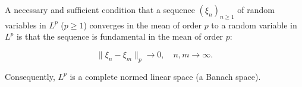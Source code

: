 A necessary and sufficient condition that a sequence $(\xi_n)_{n \geq 1}$ of random variables in $L^p$ ($p \geq 1$) converges in the mean of order $p$ to a random variable in $L^p$ is that the sequence is fundamental in the mean of order $p$:

$$\|\xi_n - \xi_m\|_p \to 0, \quad n, m \to \infty.$$

Consequently, $L^p$ is a complete normed linear space (a Banach space).
